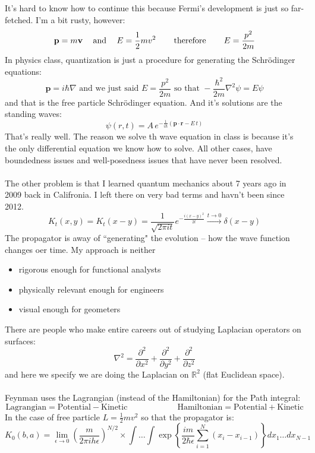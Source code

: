 \documentclass[12pt]{article}
\begin{document}
\noindent It's hard to know how to continue this because Fermi's development is just so far-fetched.  I'm a bit rusty, however:
$$ \mathbf{p} = m \mathbf{v} \hspace{0.125in}\text{ and }\hspace{0.125in} E = \frac{1}{2} m v^2 \hspace{0.25in}\text{ therefore }\hspace{0.25in} E = \frac{p^2}{2m}$$
In physics class, quantization is just a procedure for generating the Schr\"{o}dinger equations:
$$ \mathbf{p} = i\hbar \nabla \text{ and we just said }E = \frac{p^2}{2m} \text{ so that } - \frac{\hbar^2}{2m} \nabla^2 \psi = E \psi $$
and that is the free particle Schr\"{o}dinger equation.  And it's solutions are the standing waves:
$$ \psi(r, t) = A \, e^{ - \frac{1}{i\hbar}(\mathbf{p}\cdot \mathbf{r} -  E \, t)} $$
That's really well.  The reason we solve th wave equation in class is because it's the only differential equation we know how to solve. All other cases, have boundedness issues and well-posedness issues that have never been resolved. \\ \\
The other problem is that I learned quantum mechanics about 7 years ago in 2009 back in Califronia.  I left there on very bad terms and havn't been since 2012. 
$$ K_t(x,y) = K_t(x-y) = \frac{1}{\sqrt{2\pi i t}}e^{-\frac{i(x-y)^2}{2t}} \stackrel{t\to 0}{\longrightarrow} \delta (x-y)$$
The propagator is away of ``generating" the evolution -- how the wave function changes oer time.  My approach is neither
\begin{itemize}
\item rigorous enough for functional analysts
\item physically relevant enough for engineers
\item visual enough for geometers
\end{itemize}
There are people who make entire careers out of studying Laplacian operators on surfaces:
$$ \nabla^2 = \frac{\partial^2 }{\partial x^2 }
+ \frac{\partial^2 }{\partial y^2 }
+ \frac{\partial^2 }{\partial z^2 }$$
and here we specify we are doing the Laplacian on $\mathbb{R}^2$ (flat Euclidean space).\\ \\
Feynman uses the Lagrangian (instead of the Hamiltonian) for the Path integral:
$$ \text{Lagrangian} = \text{Potential}-\text{Kinetic} \hspace{1in} 
\text{Hamiltonian} = \text{Potential}+\text{Kinetic} $$
In the case of free particle $L = \frac{1}{2}mv^2$ so that the propagator is:
$$ K_0(b,a) = \lim_{\epsilon \to 0} \left( \frac{m}{2\pi i h \epsilon} \right)^{N/2} 
\times \int \dots \int \exp \left\{ \frac{im}{2\hbar\epsilon} \sum_{i=1}^N  (x_i - x_{i-1})\right\} dx_1 \dots dx_{N-1}$$
\newpage
\end{document}
